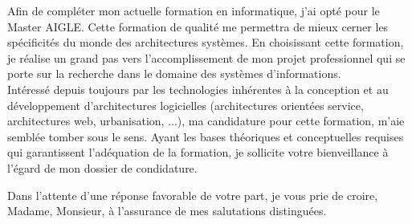 \documentclass[11pt,a4paper,sans]{moderncv}
\begin{document}
 Afin de compléter mon actuelle formation en informatique, j’ai opté pour le Master AIGLE. Cette formation de qualité me permettra de mieux cerner les spécificités du monde des architectures systèmes. En choisissant cette formation, je réalise un grand pas vers l’accomplissement de mon projet professionnel qui  se porte sur la recherche dans le domaine des systèmes d'informations.\\
 
Intéressé depuis toujours par les technologies inhérentes à la conception et au développement d’architectures logicielles (architectures orientées service, architectures web, urbanisation, ...), ma candidature pour cette formation, m’aie semblée tomber sous le sens. Ayant les bases théoriques et conceptuelles requises qui garantissent l’adéquation de la formation, je sollicite votre bienveillance à l'égard de mon dossier de condidature.

Dans l’attente d’une réponse favorable de votre part, je vous prie de croire, Madame, Monsieur, à l’assurance de mes salutations distinguées.                                                            

\makeletterclosing
\end{document}
